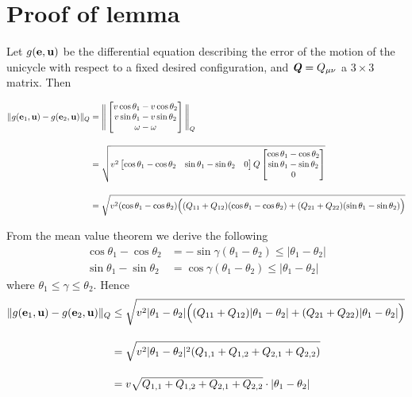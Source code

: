 \section{Proof of lemma }

Let $g(\bm{\mathbf{e}}, \bm{\mathbf{u}})$ be the differential equation describing the
error of the motion of the unicycle with respect to a fixed desired
configuration, and $\bm{\mathit{Q}} = Q_{\mu\nu}$ a $3 \times 3$ matrix. Then

\begin{align}
  \|g(\bm{\mathbf{e}}_1, \bm{\mathbf{u}}) - g(\bm{\mathbf{e}}_2, \bm{\mathbf{u}})\|_{Q} &=
  \Bigg\|
  \begin{bmatrix}
    v \cos\theta_1 - v \cos\theta_2 \\
    v \sin\theta_1 - v \sin\theta_2 \\
    \omega - \omega
  \end{bmatrix}
  \Bigg\|_Q \\[2.5ex]
  &=\sqrt{v^2
   \begin{bmatrix}
     \cos\theta_1 - \cos\theta_2 & \sin\theta_1 - \sin\theta_2 & 0
   \end{bmatrix}
   Q
   \begin{bmatrix}
     \cos\theta_1 - \cos\theta_2 \\
     \sin\theta_1 - \sin\theta_2 \\
     0
   \end{bmatrix}
  }\\[2.5ex]
  &= \sqrt{v^2 (\cos\theta_1 - \cos\theta_2)\Big( (Q_{11}+Q_{12})(\cos\theta_1 - \cos\theta_2) +
                    (Q_{21}+Q_{22})(\sin\theta_1 - \sin\theta_2)\Big)}
\end{align}

From the mean value theorem we derive the following
\begin{align}
  \cos\theta_1 - \cos\theta_2 &= -\sin\gamma (\theta_1 - \theta_2) \leq |\theta_1 - \theta_2| \\[2.5ex]
  \sin\theta_1 - \sin\theta_2 &= \cos\gamma (\theta_1 - \theta_2) \leq |\theta_1 - \theta_2|
\end{align}
where $\theta_1 \leq \gamma \leq \theta_2$. Hence
\begin{align}
  \|g(\bm{\mathbf{e}}_1, \bm{\mathbf{u}}) - g(\bm{\mathbf{e}}_2, \bm{\mathbf{u}})\|_{Q} &\leq
    \sqrt{v^2 |\theta_1 - \theta_2|
      \Big( (Q_{11}+Q_{12}) |\theta_1 - \theta_2|+ (Q_{21}+Q_{22}) |\theta_1 - \theta_2|\Big)} \\[2.5ex]
      &= \sqrt{v^2 |\theta_1 - \theta_2|^2 (Q_{1,1}+Q_{1,2}+Q_{2,1}+Q_{2,2})} \\[2.5ex]
      &= v \sqrt{Q_{1,1}+Q_{1,2}+Q_{2,1}+Q_{2,2}} \cdot |\theta_1 - \theta_2|
\end{align}
